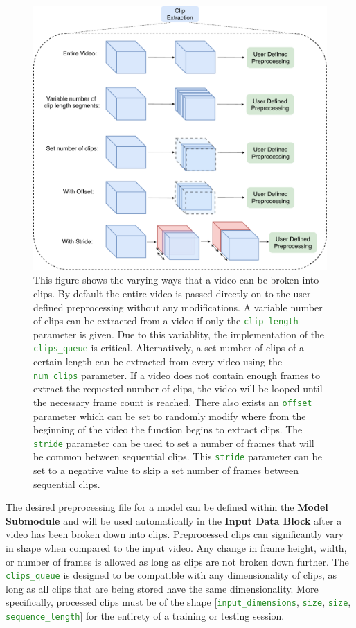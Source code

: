 \documentclass{llncs}
\begin{document}
\begin{figure}[b!]
\centering
\includegraphics[width=0.8\columnwidth]{images/extract_clips.pdf}
\caption{This figure shows the varying ways that a video can be broken into clips.
By default the entire video is passed directly on to the user defined preprocessing without any modifications.
A variable number of clips can be extracted from a video if only the \texttt{\textcolor{ForestGreen}{clip\_length}} parameter is given.
Due to this variablity, the implementation of the \texttt{\textcolor{ForestGreen}{clips\_queue}} is critical.
Alternatively, a set number of clips of a certain length can be extracted from every video using the \texttt{\textcolor{ForestGreen}{num\_clips}} parameter.
If a video does not contain enough frames to extract the requested number of clips, the video will be looped until the necessary frame count is reached.
There also exists an \texttt{\textcolor{ForestGreen}{offset}} parameter which can be set to randomly modify where from the beginning of the video the function begins to extract clips. 
The \texttt{\textcolor{ForestGreen}{stride}}  parameter can be used to set a number of frames that will be common between sequential clips.
This \texttt{\textcolor{ForestGreen}{stride}} parameter can be set to a negative value to skip a set number of frames between sequential clips.
}
\label{fig:extract_clips}
\end{figure}


The desired preprocessing file for a model can be defined within the \textbf{Model Submodule} and will be used automatically in the \textbf{Input Data Block} after a video has been broken down into clips.
Preprocessed clips can significantly vary in shape when compared to the input video.
Any change in frame height, width, or number of frames is allowed as long as clips are not broken down further.
The \texttt{\textcolor{ForestGreen}{clips\_queue}} is designed to be compatible with any dimensionality of clips, as long as all clips that are being stored have the same dimensionality.
More specifically, processed clips must be of the shape [\texttt{\textcolor{ForestGreen}{input\_dimensions}}, \texttt{\textcolor{ForestGreen}{size}}, \texttt{\textcolor{ForestGreen}{size}}, \texttt{\textcolor{ForestGreen}{sequence\_length}}] for the entirety of a training or testing session.
\end{document}
